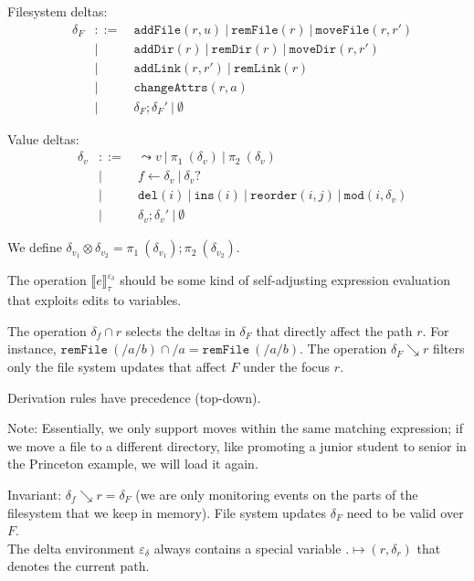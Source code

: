 \documentclass[10pt,twoside,a4paper]{article}
\theoremstyle{theorem}
\theoremstyle{lemma}
\theoremstyle{property}
\begin{document}
Filesystem deltas:
\begin{align*}
	&\delta_F & ::= & ~\mathtt{addFile}(r,u) ~|~ \mathtt{remFile}(r) ~|~ \mathtt{moveFile}(r,r')\\
	&         & |   & ~\mathtt{addDir}(r) ~|~ \mathtt{remDir}(r) ~|~ \mathtt{moveDir}(r,r')\\
	&         & |   & ~\mathtt{addLink}(r,r') ~|~ \mathtt{remLink}(r)\\
	&         & |   & ~\mathtt{changeAttrs}(r,a)\\
	&         & |   & ~\delta_F ; {\delta_F}' ~|~ \emptyset
\end{align*}

Value deltas:
\begin{align*}
	&\delta_v & ::= & ~\leadsto v ~|~ \pi_1~(\delta_v) ~|~ \pi_2~(\delta_v)\\
	&         & |   & ~f \leftarrow \delta_v ~|~ \delta_v?\\
	&         & |   & ~\mathtt{del}(i) ~|~ \mathtt{ins}(i) ~|~ \mathtt{reorder}(i,j) ~|~ \mathtt{mod}(i,\delta_v)\\
	&         & |   & ~\delta_v ; {\delta_v}' ~|~ \emptyset
\end{align*}

We define $\delta_{v_1} \otimes \delta_{v_2} = \pi_1~(\delta_{v_1}) ; \pi_2~(\delta_{v_2})$.

The operation $\llbracket e \rrbracket^{\varepsilon_\delta}_{\tau}$ should be some kind of self-adjusting expression evaluation that exploits edits to variables.

The operation $\delta_f \cap r$ selects the deltas in $\delta_F$ that directly affect the path $r$. For instance, $\mathtt{remFile}~(/a/b) \cap /a = \mathtt{remFile}~(/a/b)$. 
The operation $\delta_F \searrow r$ filters only the file system updates that affect $F$ under the focus $r$.

Derivation rules have precedence (top-down).

Note: Essentially, we only support moves within the same matching expression; if we move a file to a different directory, like promoting a junior student to senior in the Princeton example, we will load it again.

Invariant: $\delta_f \searrow r = \delta_F$ (we are only monitoring events on the parts of the filesystem that we keep in memory).
File system updates $\delta_F$ need to be valid over $F$.\\

The delta environment $\varepsilon_\delta$ always contains a special variable $. \mapsto (r,\delta_r)$ that denotes the current path.
\end{document}
